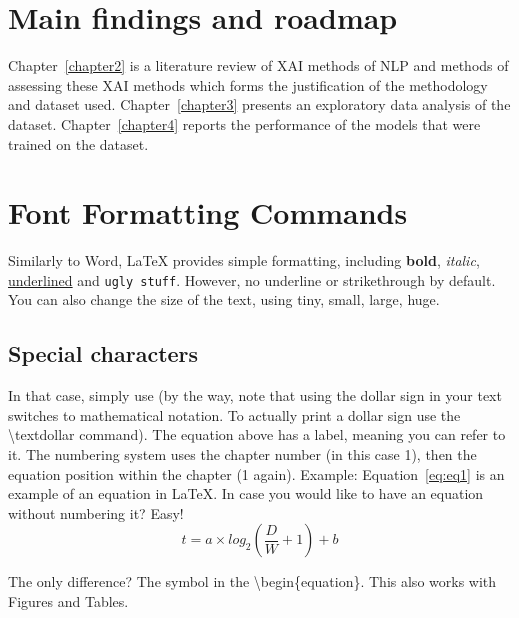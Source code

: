 \section{Main findings and roadmap}
Chapter~\ref{chapter2} is a literature review of XAI methods of NLP and methods of assessing these XAI methods which forms the justification of the methodology and dataset used. Chapter~\ref{chapter3} presents an exploratory data analysis of the dataset. Chapter~\ref{chapter4} reports the performance of the models that were trained on the dataset. 

\section{Font Formatting Commands}
Similarly to Word, LaTeX provides simple formatting, including \textbf{bold}, \textit{italic}, \underline{underlined} and \texttt{ugly stuff}.
However, no underline or strikethrough by default.
You can also change the size of the text, using {\tiny tiny}, {\small small}, {\large large}, {\huge huge}.

\subsection{Special characters}
In that case, simply use \textdollar{} (by the way, note that using the dollar sign in your text switches to mathematical notation. To actually print a dollar sign use the \textbackslash{}textdollar command).
The equation above has a label, meaning you can refer to it. The numbering system uses the chapter number (in this case 1), then the equation position within the chapter (1 again).
Example: Equation~\ref{eq:eq1} is an example of an equation in LaTeX{}.
In case you would like to have an equation without numbering it? Easy!
\begin{equation*}
t = a \times log_{2}(\frac{D}{W} + 1) + b
\end{equation*}

The only difference? The \textasteriskcentered{}  symbol in the \textbackslash{}begin\{equation\textbf{\textasteriskcentered}\}.
This also works with Figures and Tables.


